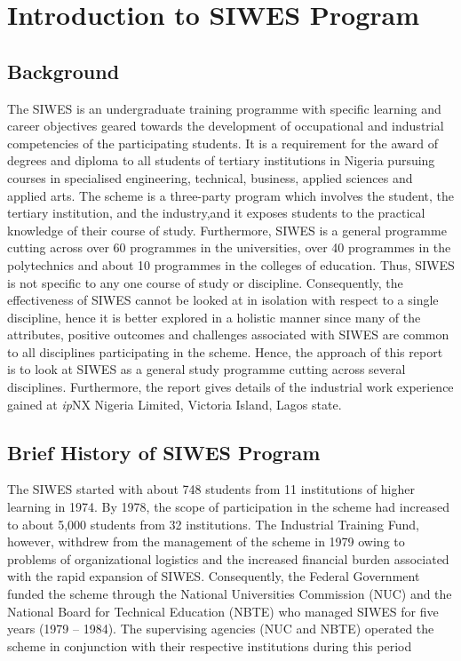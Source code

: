 \chapter{Introduction to SIWES Program}

\section{Background}


The \ac{SIWES} is an undergraduate training
programme with specific learning and career objectives geared towards the development of
occupational and industrial competencies of the participating students. It is a requirement for the
award of degrees and diploma to all students of tertiary institutions in Nigeria pursuing courses
in specialised engineering, technical, business, applied sciences and applied arts. The scheme is a
three-party program which involves the student, the tertiary institution, and the industry,and it exposes students to the practical knowledge of their course of study.
Furthermore, SIWES is a general programme cutting across over 60 programmes in the
universities, over 40 programmes in the polytechnics and about 10 programmes in the colleges of
education. Thus, SIWES is not specific to any one course of study or discipline.
Consequently, the effectiveness of SIWES cannot be looked at in isolation with respect to a single
discipline, hence it is better explored in a holistic manner since many of the attributes, positive outcomes and challenges associated with SIWES are common to all disciplines participating in the scheme.
Hence, the approach of this report is to look at SIWES as a general study programme cutting across
several disciplines. Furthermore, the report gives details of the industrial work experience gained at \textit{ip}NX Nigeria Limited, Victoria Island, Lagos state.
\section{Brief History of SIWES Program}


The \ac{SIWES} started with about 748
students from 11 institutions of higher learning in 1974. By 1978, the scope of participation in the
scheme had increased to about 5,000 students from 32 institutions. The Industrial Training Fund,
however, withdrew from the management of the scheme in 1979 owing to problems of
organizational logistics and the increased financial burden associated with the rapid expansion of SIWES. Consequently, the Federal Government funded the scheme through the National Universities Commission (NUC) and the National Board for Technical Education (NBTE) who managed SIWES for five years (1979 – 1984). The supervising agencies (NUC and NBTE)
operated the scheme in conjunction with their respective institutions during this period
